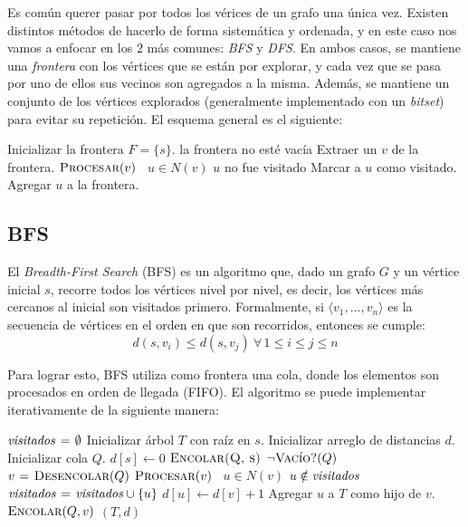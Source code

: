 \documentclass[a4paper]{report}
\newcommand{\Each}{\kw{each}\ }
\begin{document}
Es común querer pasar por todos los vérices de un grafo una única vez. Existen distintos métodos de hacerlo de forma sistemática y ordenada, y en este caso nos vamos a enfocar en los $2$ más comunes: \textit{BFS} y \textit{DFS}. En ambos casos, se mantiene una \textit{frontera} con los vértices que se están por explorar, y cada vez que se pasa por uno de ellos sus vecinos son agregados a la misma. Además, se mantiene un conjunto de los vértices explorados (generalmente implementado con un \textit{bitset}) para evitar su repetición. El esquema general es el siguiente:

\begin{codebox}
    \li Inicializar la frontera $F = \{s\}$.
    \li \While la frontera no esté vacía \Do
    \li Extraer un $v$ de la frontera.
    \li $\textnormal{\scshape Procesar}(v)$
    \li \For \Each $u \in N(v)$ \Do
    \li \If $u$ no fue visitado \Then
    \li Marcar a $u$ como visitado.
    \li Agregar $u$ a la frontera.
    \End
    \End
    \End
\end{codebox}

\subsection{BFS}

El \textit{Breadth-First Search} (BFS) es un algoritmo que, dado un grafo $G$ y un vértice inicial $s$, recorre todos los vértices nivel por nivel, es decir, los vértices más cercanos al inicial son visitados primero. Formalmente, si $\langle v_1, ..., v_n \rangle$ es la secuencia de vértices en el orden en que son recorridos, entonces se cumple:
$$d(s, v_i) \leq d(s, v_j)\ \forall\,1 \leq i \leq j \leq n$$

Para lograr esto, BFS utiliza como frontera una cola, donde los elementos son procesados en orden de llegada (FIFO). El algoritmo se puede implementar iterativamente de la siguiente manera:

\begin{codebox}
        \li $\id{visitados} \gets \emptyset$
        \li Inicializar árbol $T$ con raíz en $s$.
        \li Inicializar arreglo de distancias $d$.
        \li Inicializar cola $Q$.
        \li $d[s] \gets 0$
        \li $\textnormal{\scshape Encolar(Q, s)}$
        \li \While $\neg\textnormal{\scshape Vacío?}(Q)$ \Do
        \li $v \mathrel{\hspace{1pt}=\hspace{1pt}} \textnormal{\scshape Desencolar}(Q)$
        \li $\textnormal{\scshape Procesar}(v)$
        \li \For \Each $u \in N(v)$ \Do
        \li \If $u \notin \id{visitados}$ \Then
        \li $\id{visitados} \gets \id{visitados} \cup \{u\}$
        \li $d[u] \gets d[v] + 1$
        \li Agregar $u$ a $T$ como hijo de $v$.
        \li $\textnormal{\scshape Encolar}(Q, v)$
        \End
        \End
        \End
        \li \Return $(T, d)$
\end{codebox}
\end{document}
